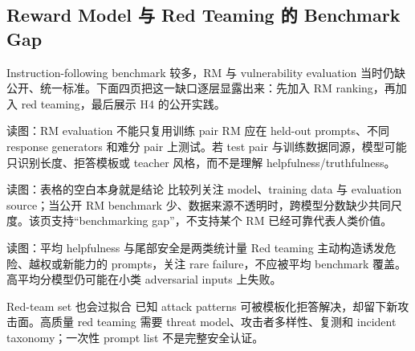 \subsection{Reward Model 与 Red Teaming 的 Benchmark Gap}

Instruction-following benchmark 较多，RM 与 vulnerability evaluation 当时仍缺公开、统一标准。下面四页把这一缺口逐层显露出来：先加入 RM ranking，再加入 red teaming，最后展示 H4 的公开实践。


\begin{knowledgebox}{读图：RM evaluation 不能只复用训练 pair}
RM 应在 held-out prompts、不同 response generators 和难分 pair 上测试。若 test pair 与训练数据同源，模型可能只识别长度、拒答模板或 teacher 风格，而不是理解 helpfulness/truthfulness。
\end{knowledgebox}


\begin{knowledgebox}{读图：表格的空白本身就是结论}
比较列关注 model、training data 与 evaluation source；当公开 RM benchmark 少、数据来源不透明时，跨模型分数缺少共同尺度。该页支持“benchmarking gap”，不支持某个 RM 已经可靠代表人类价值。
\end{knowledgebox}


\begin{knowledgebox}{读图：平均 helpfulness 与尾部安全是两类统计量}
Red teaming 主动构造诱发危险、越权或新能力的 prompts，关注 rare failure，不应被平均 benchmark 覆盖。高平均分模型仍可能在小类 adversarial inputs 上失败。
\end{knowledgebox}


\begin{warningbox}{Red-team set 也会过拟合}
已知 attack patterns 可被模板化拒答解决，却留下新攻击面。高质量 red teaming 需要 threat model、攻击者多样性、复测和 incident taxonomy；一次性 prompt list 不是完整安全认证。
\end{warningbox}

